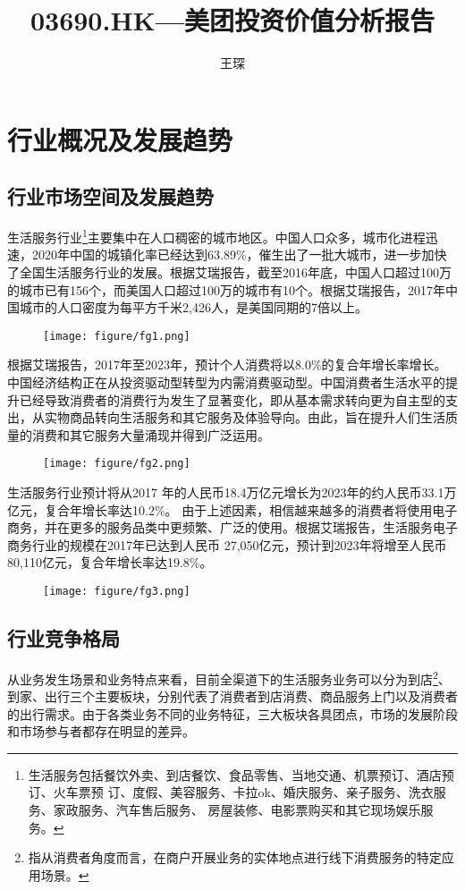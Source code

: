 \documentclass[UTF8,a4paper,12pt,lang=cn,fontset = windows]{elegantpaper} %
\title{03690.HK—美团投资价值分析报告} %
\author{王琛}
\date{\zhtoday}
\begin{document}
\maketitle
\section{行业概况及发展趋势}
\subsection{行业市场空间及发展趋势}
生活服务行业\footnote{生活服务包括餐饮外卖、到店餐饮、食品零售、当地交通、机票预订、酒店预订、火车票预 订、度假、美容服务、卡拉ok、婚庆服务、亲子服务、洗衣服务、家政服务、汽车售后服务、 房屋装修、电影票购买和其它现场娱乐服务。}主要集中在人口稠密的城市地区。中国人口众多，城市化进程迅速，2020年中国的城镇化率已经达到63.89\%，催生出了一批大城市，进一步加快了全国生活服务行业的发展。根据艾瑞报告，截至2016年底，中国人口超过100万的城市已有156个，而美国人口超过100万的城市有10个。根据艾瑞报告，2017年中国城市的人口密度为每平方千米2,426人，是美国同期的7倍以上。
\begin{figure}[htbp]
    \centering
    \texttt{[image: figure/fg1.png]}
    \end{figure}

根据艾瑞报告，2017年至2023年，预计个人消费将以8.0\%的复合年增长率增长。中国经济结构正在从投资驱动型转型为内需消费驱动型。中国消费者生活水平的提升已经导致消费者的消费行为发生了显著变化，即从基本需求转向更为自主型的支出，从实物商品转向生活服务和其它服务及体验导向。由此，旨在提升人们生活质量的消费和其它服务大量涌现并得到广泛运用。
\begin{figure}[htbp]
    \centering
    \texttt{[image: figure/fg2.png]}
    \end{figure}

生活服务行业预计将从2017 年的人民币18.4万亿元增长为2023年的约人民币33.1万亿元，复合年增长率达10.2\%。 由于上述因素，相信越来越多的消费者将使用电子商务，并在更多的服务品类中更频繁、广泛的使用。根据艾瑞报告，生活服务电子商务行业的规模在2017年已达到人民币 27,050亿元，预计到2023年将增至人民币80,110亿元，复合年增长率达19.8\%。
\begin{figure}[htbp]
    \centering
    \texttt{[image: figure/fg3.png]}
    \end{figure}

\subsection{行业竞争格局}
从业务发生场景和业务特点来看，目前全渠道下的生活服务业务可以分为到店\footnote{指从消费者角度而言，在商户开展业务的实体地点进行线下消费服务的特定应用场景。}、到家、出行三个主要板块，分别代表了消费者到店消费、商品服务上门以及消费者的出行需求。由于各类业务不同的业务特征，三大板块各具团点，市场的发展阶段和市场参与者都存在明显的差异。
\end{document}
